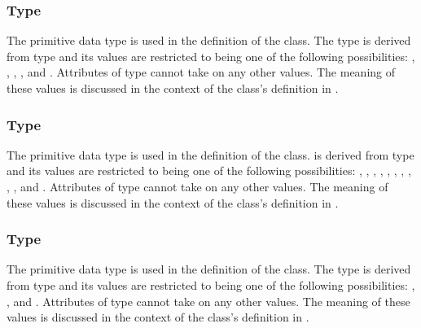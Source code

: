 \subsubsection{Type \fixttspace{}}
\label{primtype-boundaryconditionkind}

The  primitive data type is used in the definition of the \BoundaryCondition class.  The type  is derived from type  and its values are restricted to being one of the following possibilities: , , , , and .  Attributes of type  cannot take on any other values.  The meaning of these values is discussed in the context of the \BoundaryCondition class's definition in .


\subsubsection{Type \fixttspace{}}
\label{primtype-componentkind}

The  primitive data type is used in the definition of the \CoordinateComponent class.   is derived from type  and its values are restricted to being one of the following possibilities: , , , , , , , , , , and .  Attributes of type  cannot take on any other values.  The meaning of these values is discussed in the context of the \CoordinateComponent class's definition in .


\subsubsection{Type \fixttspace{}}
\label{primtype-coordinatekind}

The  primitive data type is used in the definition of the \CoordinateComponent class.  The type  is derived from type  and its values are restricted to being one of the following possibilities: , , and .  Attributes of type  cannot take on any other values.  The meaning of these values is discussed in the context of the \CoordinateComponent class's definition in .


